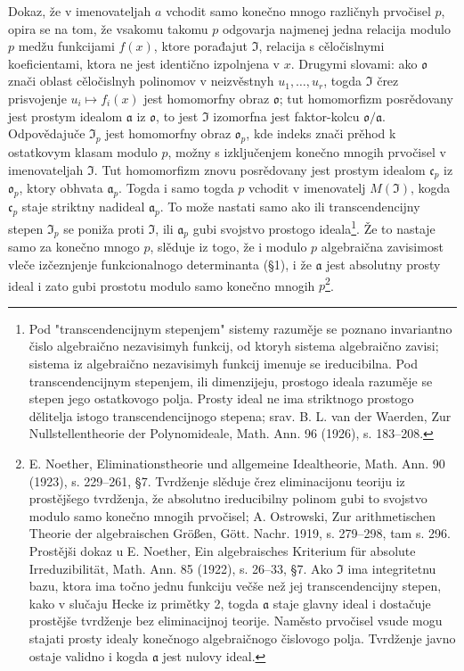 \documentclass[11pt]{article}
\begin{document}
Dokaz, že v imenovateljah \(a\) vchodit samo konečno mnogo različnyh prvočisel \(p\), opira se na tom, že vsakomu takomu \(p\) odgovarja najmenej jedna relacija modulo \(p\) medžu funkcijami \(f(x)\), ktore porađajut \(\mathfrak{I}\), relacija s cěločislnymi koeficientami, ktora ne jest identično izpolnjena v \(x\). Drugymi slovami: ako \(\mathfrak{o}\) znači oblast cěločislnyh polinomov v neizvěstnyh \(u_1,\ldots,u_r\), togda \(\mathfrak{I}\) črez prisvojenje \(u_i\mapsto f_i(x)\) jest homomorfny obraz \(\mathfrak{o}\); tut homomorfizm posrědovany jest prostym idealom \(\mathfrak{a}\) iz \(\mathfrak{o}\), to jest \(\mathfrak{I}\) izomorfna jest faktor-kolcu \(\mathfrak{o}/\mathfrak{a}\). Odpovědajuče \(\mathfrak{I}_p\) jest homomorfny obraz \(\mathfrak{o}_p\), kde indeks znači prěhod k ostatkovym klasam modulo \(p\), možny s izključenjem konečno mnogih prvočisel v imenovateljah \(\mathfrak{I}\). Tut homomorfizm znovu posrědovany jest prostym idealom \(\mathfrak{c}_p\) iz \(\mathfrak{o}_p\), ktory obhvata \(\mathfrak{a}_p\). Togda i samo togda \(p\) vchodit v imenovatelj \(M(\mathfrak{I})\), kogda \(\mathfrak{c}_p\) staje striktny nadideal \(\mathfrak{a}_p\). To može nastati samo ako ili transcendencijny stepen \(\mathfrak{I}_p\) se poniža proti \(\mathfrak{I}\), ili \(\mathfrak{a}_p\) gubi svojstvo prostogo ideala\footnote{Pod "transcendencijnym stepenjem" sistemy razuměje se poznano invariantno čislo algebraično nezavisimyh funkcij, od ktoryh sistema algebraično zavisi; sistema iz algebraično nezavisimyh funkcij imenuje se ireducibilna. Pod transcendencijnym stepenjem, ili dimenzijeju, prostogo ideala razuměje se stepen jego ostatkovogo polja. Prosty ideal ne ima striktnogo prostogo dělitelja istogo transcendencijnogo stepena; srav. B. L. van der Waerden, Zur Nullstellentheorie der Polynomideale, Math. Ann. 96 (1926), s. 183--208.}. Že to nastaje samo za konečno mnogo \(p\), slěduje iz togo, že i modulo \(p\) algebraična zavisimost vleče izčeznjenje funkcionalnogo determinanta (§1), i že \(\mathfrak{a}\) jest absolutny prosty ideal i zato gubi prostotu modulo samo konečno mnogih \(p\)\footnote{E. Noether, Eliminationstheorie und allgemeine Idealtheorie, Math. Ann. 90 (1923), s. 229--261, §7. Tvrdženje slěduje črez eliminacijonu teoriju iz prostějšego tvrdženja, že absolutno ireducibilny polinom gubi to svojstvo modulo samo konečno mnogih prvočisel; A. Ostrowski, Zur arithmetischen Theorie der algebraischen Größen, Gött. Nachr. 1919, s. 279--298, tam s. 296. Prostějši dokaz u E. Noether, Ein algebraisches Kriterium für absolute Irreduzibilität, Math. Ann. 85 (1922), s. 26--33, §7. Ako \(\mathfrak{I}\) ima integritetnu bazu, ktora ima točno jednu funkciju večše než jej transcendencijny stepen, kako v slučaju Hecke iz primětky 2, togda \(\mathfrak{a}\) staje glavny ideal i dostačuje prostějše tvrdženje bez eliminacijnoj teorije. Naměsto prvočisel vsude mogu stajati prosty idealy konečnogo algebraičnogo čislovogo polja. Tvrdženje javno ostaje validno i kogda \(\mathfrak{a}\) jest nulovy ideal.}.
\end{document}
